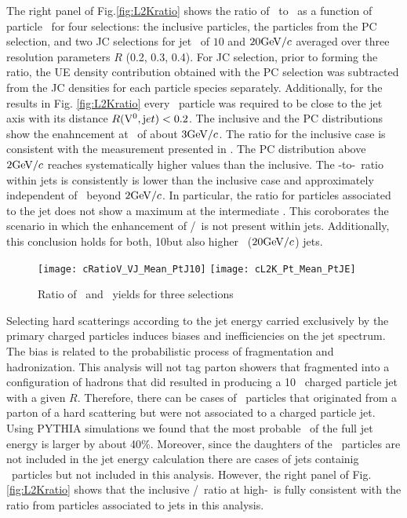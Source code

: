 
The right panel of Fig.\ref{fig:L2Kratio} shows the ratio of \lda\ to \ks\ as a function of particle \pt\ for four selections: the inclusive particles, the particles from the PC selection, and two JC selections for jet \pt\ of $10$ and $20 \mathrm{GeV}/c$ averaged over three resolution parameters $R$ (0.2, 0.3, 0.4). 
For JC selection, prior to forming the ratio, the UE density contribution obtained with the PC selection was subtracted from the JC densities for each particle species separately.
Additionally, for the results in Fig. \ref{fig:L2Kratio} every \Vzero\ particle was required to be close to the jet axis with its distance $R({\rm V}^0,{\mathrm jet}) < 0.2$.
The inclusive and the PC distributions show the enahncement at \pt\ of about $3 \mathrm{GeV}/c$. 
The ratio for the inclusive case is consistent with the measurement presented in \cite{Abelev:2013haa}.
The PC distribution above $2 \mathrm{GeV}/c$ reaches systematically higher values than the inclusive. 
The \lda-to-\ks\ ratio within jets is consistently is lower than the inclusive case and approximately independent of \pt\ beyond $2 \mathrm{GeV}/c$.
In particular, the ratio for particles associated to the jet does not show a maximum at the intermediate \pt.
This coroborates the scenario in which the enhancement of \lda/\ks\ is not present within jets.
Additionally, this conclusion holds for both, 10\gevc but also higher \pt\ ($20 \mathrm{GeV}/c$) jets.

\begin{figure}[htbp]
	\centering
	\texttt{[image: cRatioV\_VJ\_Mean\_PtJ10]}
	\texttt{[image: cL2K\_Pt\_Mean\_PtJE]}
	\caption{Ratio of \lda\ and \ks\ yields for three selections  }
	\label{fig:L2Kratio}
	\label{fig:LKR}
\end{figure}

Selecting hard scatterings according to the jet energy carried exclusively by the primary charged particles induces biases and inefficiencies on the jet spectrum.
The bias is related to the probabilistic process of fragmentation and hadronization.
This analysis will not tag parton showers that fragmented into a configuration of hadrons that did resulted in producing a 10 \gev\ charged particle jet with a given $R$.
Therefore, there can be cases of \Vzero\ particles that originated from a parton of a hard scattering but were not associated to a charged particle jet. 
Using PYTHIA simulations we found that the most probable \pt\ of the full jet energy is larger by about 40\%. 
Moreover, since the daughters of the \Vzero\ particles are not included in the jet energy calculation there are cases of jets containig \Vzero\ particles but not included in this analysis. 
However, the right panel of Fig. \ref{fig:L2Kratio} shows that the inclusive \lda/\ks\ ratio at high-\pt\ is fully consistent with the ratio from particles associated to jets in this analysis.

